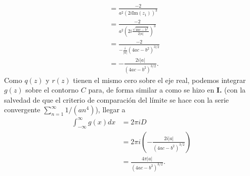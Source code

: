 {\begin{itemize}
$$\begin{aligned}
               &=\frac{-2}{a^2\left( 2i\text{Im}(z_1)\right)^3}\\
               &=\frac{-2}{a^2\left( 2i\frac{\sqrt{4ac-b^2}}{2|a|}\right)^3}\\
               &=\frac{-2}{-\frac{i}{|a|}(4ac-b^2)^{3/2}}\\
               &=-\frac{2i|a|}{(4ac-b^2)^{3/2}}.
         \end{aligned}
         $$
         Como $q(z)$ y $r(z)$ tienen el mismo cero sobre el eje real, podemos integrar $g(z)$ sobre el contorno $C$ para, de forma similar a como se hizo en \textbf{I.} (con la salvedad de que el criterio de comparación del límite se hace con la serie convergente $\sum_{n=1}^{\infty}1/(an^4)$), llegar a
         $$
         \begin{aligned}
            \int_{-\infty}^{\infty}g(x)dx&=2\pi i D\\
                                         &=2\pi i\left( -\frac{2i|a|}{(4ac-b^2)^{3/2}}\right)\\
                                         &=\frac{4\pi|a|}{(4ac-b^2)^{3/2}}.
         \end{aligned}
         $$
   \end{itemize}
  }
\hfill\qedsymbol
